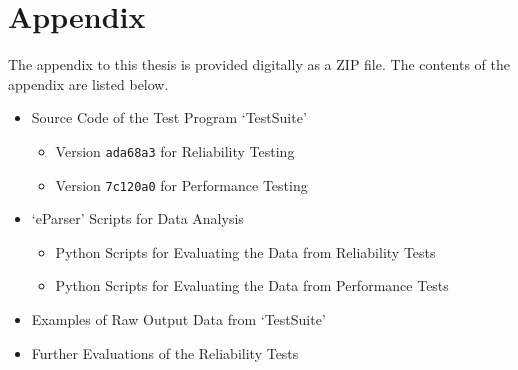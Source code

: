 \chapter{Appendix}
The appendix to this thesis is provided digitally as a ZIP file. The contents of the appendix are listed below.

\begin{itemize}
	\item Source Code of the Test Program `TestSuite'
		\begin{itemize}
			\item Version \texttt{ada68a3} for Reliability Testing
			\item Version \texttt{7c120a0} for Performance Testing
		\end{itemize}
	\item `eParser' Scripts for Data Analysis
		\begin{itemize}
			\item Python Scripts for Evaluating the Data from Reliability Tests
			\item Python Scripts for Evaluating the Data from Performance Tests
		\end{itemize}
	\item Examples of Raw Output Data from `TestSuite'
	\item Further Evaluations of the Reliability Tests
\end{itemize}
